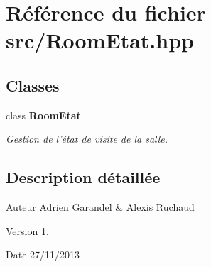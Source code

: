 \section{Référence du fichier src/\-Room\-Etat.hpp}
\label{_room_etat_8hpp}
\subsection*{Classes}
\begin{DoxyCompactItemize}
\item 
class {\bf Room\-Etat}
\begin{DoxyCompactList}\small\item\em Gestion de l'état de visite de la salle. \end{DoxyCompactList}\end{DoxyCompactItemize}


\subsection{Description détaillée}
\begin{DoxyAuthor}{Auteur}
Adrien Garandel \& Alexis Ruchaud 
\end{DoxyAuthor}
\begin{DoxyVersion}{Version}
1. 
\end{DoxyVersion}
\begin{DoxyDate}{Date}
27/11/2013 
\end{DoxyDate}
